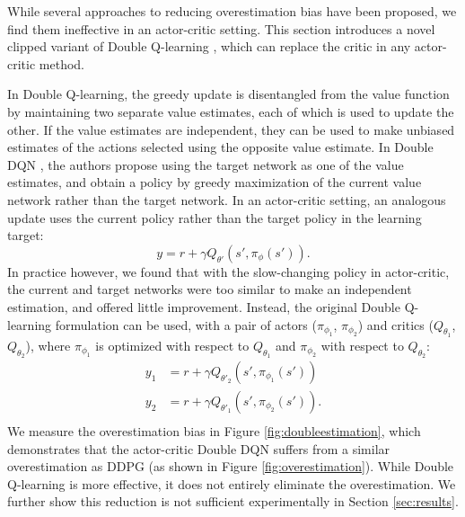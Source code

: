 \documentclass{article}
\newcommand{\y}{\gamma}
\begin{document}
While several approaches to reducing overestimation bias have been proposed, we find them ineffective in an actor-critic setting. This section introduces a novel clipped variant of Double Q-learning \cite{hasselt2010double}, which can replace the critic in any actor-critic method. 

In Double Q-learning, the greedy update is disentangled from the value function by maintaining two separate value estimates, each of which is used to update the other. If the value estimates are independent, they can be used to make unbiased estimates of the actions selected using the opposite value estimate. In Double DQN \cite{DoubleDQN}, the authors propose using the target network as one of the value estimates, and obtain a policy by greedy maximization of the current value network rather than the target network. In an actor-critic setting, an analogous update uses the current policy rather than the target policy in the learning target:
\begin{equation}
y = r + \y Q_{\theta'}(s', \pi_\phi(s')).
\end{equation}
In practice however, we found that with the slow-changing policy in actor-critic, the current and target networks were too similar to make an independent estimation, and offered little improvement.
Instead, the original Double Q-learning formulation can be used, with a pair of actors ($\pi_{\phi_1}$, $\pi_{\phi_2}$) and critics ($Q_{\theta_1}$, $Q_{\theta_2}$), where $\pi_{\phi_1}$ is optimized with respect to $Q_{\theta_1}$ and $\pi_{\phi_2}$ with respect to $Q_{\theta_2}$:
\begin{equation}
\begin{aligned}
y_1 &= r + \y Q_{\theta'_2}(s',\pi_{\phi_1}(s')) \\
y_2 &= r + \y Q_{\theta'_1}(s',\pi_{\phi_2}(s')). \\
\end{aligned}
\end{equation}
We measure the overestimation bias in Figure \ref{fig:doubleestimation}, which demonstrates that the actor-critic Double DQN suffers from a similar overestimation as DDPG (as shown in Figure \ref{fig:overestimation}). While Double Q-learning is more effective, it does not entirely eliminate the overestimation. We further show this reduction is not sufficient experimentally in Section \ref{sec:results}. 
\end{document}
